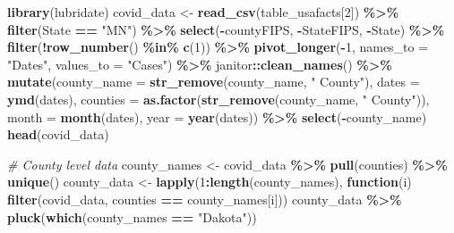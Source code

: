 \documentclass[
]{book}
\newenvironment{Shaded}{\begin{snugshade}}{\end{snugshade}}
\newcommand{\AttributeTok}[1]{\textcolor[rgb]{0.13,0.29,0.53}{#1}}
\newcommand{\CommentTok}[1]{\textcolor[rgb]{0.56,0.35,0.01}{\textit{#1}}}
\newcommand{\ControlFlowTok}[1]{\textcolor[rgb]{0.13,0.29,0.53}{\textbf{#1}}}
\newcommand{\DecValTok}[1]{\textcolor[rgb]{0.00,0.00,0.81}{#1}}
\newcommand{\FunctionTok}[1]{\textcolor[rgb]{0.13,0.29,0.53}{\textbf{#1}}}
\newcommand{\NormalTok}[1]{#1}
\newcommand{\OtherTok}[1]{\textcolor[rgb]{0.56,0.35,0.01}{#1}}
\newcommand{\SpecialCharTok}[1]{\textcolor[rgb]{0.81,0.36,0.00}{\textbf{#1}}}
\newcommand{\StringTok}[1]{\textcolor[rgb]{0.31,0.60,0.02}{#1}}
\begin{document}
\begin{Shaded}
\begin{Highlighting}[]
\FunctionTok{library}\NormalTok{(lubridate)}
\NormalTok{covid\_data }\OtherTok{\textless{}{-}} \FunctionTok{read\_csv}\NormalTok{(table\_usafacts[}\DecValTok{2}\NormalTok{]) }\SpecialCharTok{\%\textgreater{}\%} \FunctionTok{filter}\NormalTok{(State }\SpecialCharTok{==} \StringTok{"MN"}\NormalTok{) }\SpecialCharTok{\%\textgreater{}\%} 
  \FunctionTok{select}\NormalTok{(}\SpecialCharTok{{-}}\NormalTok{countyFIPS, }\SpecialCharTok{{-}}\NormalTok{StateFIPS, }\SpecialCharTok{{-}}\NormalTok{State) }\SpecialCharTok{\%\textgreater{}\%} 
  \FunctionTok{filter}\NormalTok{(}\SpecialCharTok{!}\FunctionTok{row\_number}\NormalTok{() }\SpecialCharTok{\%in\%} \FunctionTok{c}\NormalTok{(}\DecValTok{1}\NormalTok{)) }\SpecialCharTok{\%\textgreater{}\%} 
  \FunctionTok{pivot\_longer}\NormalTok{(}\SpecialCharTok{{-}}\DecValTok{1}\NormalTok{, }\AttributeTok{names\_to =} \StringTok{"Dates"}\NormalTok{, }\AttributeTok{values\_to =} \StringTok{"Cases"}\NormalTok{) }\SpecialCharTok{\%\textgreater{}\%} 
\NormalTok{  janitor}\SpecialCharTok{::}\FunctionTok{clean\_names}\NormalTok{() }\SpecialCharTok{\%\textgreater{}\%} 
  \FunctionTok{mutate}\NormalTok{(}\AttributeTok{county\_name =} \FunctionTok{str\_remove}\NormalTok{(county\_name, }\StringTok{" County"}\NormalTok{), }
         \AttributeTok{dates =} \FunctionTok{ymd}\NormalTok{(dates), }
         \AttributeTok{counties =} \FunctionTok{as.factor}\NormalTok{(}\FunctionTok{str\_remove}\NormalTok{(county\_name, }\StringTok{" County"}\NormalTok{)), }
         \AttributeTok{month =} \FunctionTok{month}\NormalTok{(dates), }
         \AttributeTok{year =} \FunctionTok{year}\NormalTok{(dates)) }\SpecialCharTok{\%\textgreater{}\%}
  \FunctionTok{select}\NormalTok{(}\SpecialCharTok{{-}}\NormalTok{county\_name)}
\FunctionTok{head}\NormalTok{(covid\_data)}
\end{Highlighting}
\end{Shaded}

\begin{Shaded}
\begin{Highlighting}[]
\CommentTok{\# County level data}
\NormalTok{county\_names }\OtherTok{\textless{}{-}}\NormalTok{ covid\_data }\SpecialCharTok{\%\textgreater{}\%} \FunctionTok{pull}\NormalTok{(counties) }\SpecialCharTok{\%\textgreater{}\%} \FunctionTok{unique}\NormalTok{()}
\NormalTok{county\_data }\OtherTok{\textless{}{-}} \FunctionTok{lapply}\NormalTok{(}\DecValTok{1}\SpecialCharTok{:}\FunctionTok{length}\NormalTok{(county\_names), }\ControlFlowTok{function}\NormalTok{(i) }\FunctionTok{filter}\NormalTok{(covid\_data, counties }\SpecialCharTok{==}\NormalTok{ county\_names[i]))}
\NormalTok{county\_data }\SpecialCharTok{\%\textgreater{}\%} \FunctionTok{pluck}\NormalTok{(}\FunctionTok{which}\NormalTok{(county\_names }\SpecialCharTok{==} \StringTok{"Dakota"}\NormalTok{))}
\end{Highlighting}
\end{Shaded}
\end{document}

